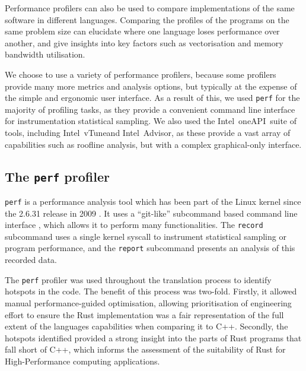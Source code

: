 Performance profilers can also be used to compare implementations of the same software in different languages. Comparing the  profiles of the programs on the same problem size can elucidate where one language loses performance over another, and give insights into key factors such as vectorisation and memory bandwidth utilisation.

We choose to use a variety of performance profilers, because some profilers provide many more metrics and analysis options, but typically at the expense of the simple and ergonomic user interface. As a result of this, we used \texttt{perf} for the majority of profiling tasks, as they provide a convenient command line interface for instrumentation statistical sampling. We also used the Intel\textregistered\ oneAPI\texttrademark\ suite of tools, including Intel\textregistered\ vTune\texttrademark and Intel\textregistered\ Advisor\texttrademark, as these provide a vast array of capabilities such as roofline analysis, but with a complex graphical-only interface.


\subsection{The \texttt{perf} profiler}
\label{ssec:perf-profiler}

\texttt{perf} is a performance analysis tool which has been part of the Linux kernel since the 2.6.31 release in 2009 \cite{PerfcountersAddedMainline}. It uses a ``git-like'' subcommand based command line interface  \cite{de2010new}, which allows it to perform many functionalities. The \texttt{record} subcommand uses a single kernel syscall to instrument statistical sampling or program performance, and the \texttt{report} subcommand presents an analysis of this recorded data.

The \texttt{perf} profiler was used throughout the translation process to identify hotspots in the code. The benefit of this process was two-fold. Firstly, it allowed manual performance-guided optimisation, allowing prioritisation of engineering effort to ensure the Rust implementation was a fair representation of the full extent of the languages capabilities when comparing it to C++. Secondly, the hotspots identified provided a strong insight into the parts of Rust programs that fall short of C++, which informs the assessment of the suitability of Rust for High-Performance computing applications.

